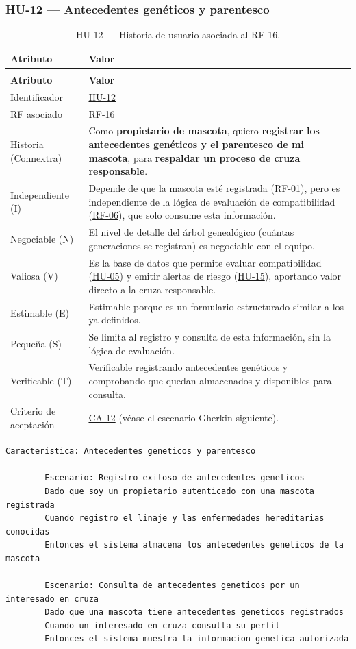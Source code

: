 \documentclass[journal,onecolumn]{IEEEtran}
\makeatletter
\newenvironment{atributos}[2]{%
	\small
	\begin{longtable}{@{}>{\raggedright\arraybackslash}p{4.2cm} >{\raggedright\arraybackslash}p{11.2cm}@{}}
		\caption{#2}\label{tab:#1}\\
		\toprule
		\textbf{Atributo} & \textbf{Valor} \\
		\midrule
		\endfirsthead
		\multicolumn{2}{@{}l}{\small\itshape (continuación)}\\
		\toprule
		\textbf{Atributo} & \textbf{Valor} \\
		\midrule
		\endhead
		\bottomrule
		\endlastfoot
	}{%
	\end{longtable}
	\normalsize
}
\makeatother
\begin{document}
	\subsubsection{HU-12 --- Antecedentes genéticos y parentesco}
	
	\begin{atributos}{HU-12}{HU-12 --- Historia de usuario asociada al RF-16.}
		Identificador & \hyperref[tab:HU-12]{HU-12} \\
		RF asociado & \hyperref[tab:RF-16]{RF-16} \\
		Historia (Connextra) & Como \textbf{propietario de mascota}, quiero \textbf{registrar los antecedentes genéticos y el parentesco de mi mascota}, para \textbf{respaldar un proceso de cruza responsable}. \\
		Independiente (I) & Depende de que la mascota esté registrada (\hyperref[tab:RF-01]{RF-01}), pero es independiente de la lógica de evaluación de compatibilidad (\hyperref[tab:RF-06]{RF-06}), que solo consume esta información. \\
		Negociable (N) & El nivel de detalle del árbol genealógico (cuántas generaciones se registran) es negociable con el equipo. \\
		Valiosa (V) & Es la base de datos que permite evaluar compatibilidad (\hyperref[tab:HU-05]{HU-05}) y emitir alertas de riesgo (\hyperref[tab:HU-15]{HU-15}), aportando valor directo a la cruza responsable. \\
		Estimable (E) & Estimable porque es un formulario estructurado similar a los ya definidos. \\
		Pequeña (S) & Se limita al registro y consulta de esta información, sin la lógica de evaluación. \\
		Verificable (T) & Verificable registrando antecedentes genéticos y comprobando que quedan almacenados y disponibles para consulta. \\
		Criterio de aceptación & \hyperref[lst:ca12]{CA-12} (véase el escenario Gherkin siguiente). \\
	\end{atributos}
	
	\begin{lstlisting}[style=gherkin,caption={CA-12 --- Escenario de aceptación de la historia HU-12.},label={lst:ca12}]
		Caracteristica: Antecedentes geneticos y parentesco
		
		Escenario: Registro exitoso de antecedentes geneticos
		Dado que soy un propietario autenticado con una mascota registrada
		Cuando registro el linaje y las enfermedades hereditarias conocidas
		Entonces el sistema almacena los antecedentes geneticos de la mascota
		
		Escenario: Consulta de antecedentes geneticos por un interesado en cruza
		Dado que una mascota tiene antecedentes geneticos registrados
		Cuando un interesado en cruza consulta su perfil
		Entonces el sistema muestra la informacion genetica autorizada
	\end{lstlisting}
	
\end{document}

